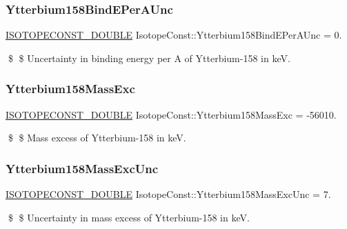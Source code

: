 \subsubsection{\texorpdfstring{Ytterbium158\+Bind\+E\+Per\+A\+Unc}{Ytterbium158BindEPerAUnc}}
{\footnotesize\ttfamily \mbox{\hyperlink{group___isotope_const-_macros_ga8f45a7272ce02c0b4c65c44636ed719a}{I\+S\+O\+T\+O\+P\+E\+C\+O\+N\+S\+T\+\_\+\+D\+O\+U\+B\+LE}} Isotope\+Const\+::\+Ytterbium158\+Bind\+E\+Per\+A\+Unc = 0.}

\$ \$ Uncertainty in binding energy per A of Ytterbium-\/158 in keV. \mbox{\label{group___isotope_const-_ytterbium-_yb158_ga6e19af7461159734ebd3e99bc8aa16fe}} 
\subsubsection{\texorpdfstring{Ytterbium158\+Mass\+Exc}{Ytterbium158MassExc}}
{\footnotesize\ttfamily \mbox{\hyperlink{group___isotope_const-_macros_ga8f45a7272ce02c0b4c65c44636ed719a}{I\+S\+O\+T\+O\+P\+E\+C\+O\+N\+S\+T\+\_\+\+D\+O\+U\+B\+LE}} Isotope\+Const\+::\+Ytterbium158\+Mass\+Exc = -\/56010.}

\$ \$ Mass excess of Ytterbium-\/158 in keV. \mbox{\label{group___isotope_const-_ytterbium-_yb158_ga099f8b9fee0ea939080a3ffe2221b31b}} 
\subsubsection{\texorpdfstring{Ytterbium158\+Mass\+Exc\+Unc}{Ytterbium158MassExcUnc}}
{\footnotesize\ttfamily \mbox{\hyperlink{group___isotope_const-_macros_ga8f45a7272ce02c0b4c65c44636ed719a}{I\+S\+O\+T\+O\+P\+E\+C\+O\+N\+S\+T\+\_\+\+D\+O\+U\+B\+LE}} Isotope\+Const\+::\+Ytterbium158\+Mass\+Exc\+Unc = 7.}

\$ \$ Uncertainty in mass excess of Ytterbium-\/158 in keV. \mbox{\label{group___isotope_const-_ytterbium-_yb158_gaf6b37cd3381ef865f28e8bbeba2477e7}} 
